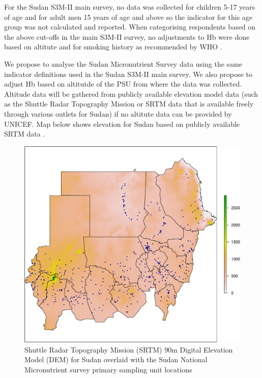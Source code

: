 \documentclass[12pt,a4paper]{article}
\begin{document}
For the Sudan S3M-II main survey, no data was collected for children 5-17 years of age and for adult men 15 years of age and above so the indicator for this age group was not calculated and reported. When categorising respondents based on the above cut-offs in the main S3M-II survey, no adjustments to Hb were done based on altitute and for smoking history as recommended by WHO \citep{WorldHealthOrganization:2007tx, WorldHealthOrganization:2011ut}.

We propose to analyse the Sudan Micronutrient Survey data using the same indicator definitions used in the Sudan S3M-II main survey. We also propose to adjust Hb based on altitutde of the PSU from where the data was collected. Altitude data will be gathered from publicly available elevation model data (such as the Shuttle Radar Topography Mission or SRTM data that is available freely through various outlets for Sudan) if no altitute data can be provided by UNICEF. Map below shows elevation for Sudan based on publicly available SRTM data \citep{cgiar:2020}.

\begin{figure}[H]

{\centering \includegraphics{sudanMNindicators_files/figure-latex/elevation1-1} 

}

\caption{Shuttle Radar Topography Mission (SRTM) 90m Digital Elevation Model (DEM) for Sudan overlaid with the Sudan National Micronutrient survey primary sampling unit locations}\label{fig:elevation1}
\end{figure}
\end{document}
